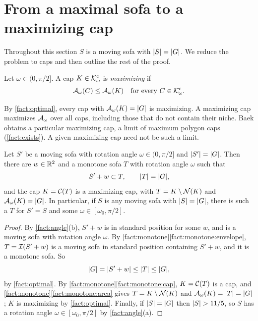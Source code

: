 \section{From a maximal sofa to a maximizing cap}\label{sec:reduction}

Throughout this section $S$ is a moving sofa with $\lvert S\rvert=\lvert G\rvert$. We reduce
the problem to caps and then outline the rest of the proof.

\begin{definition}\label{def:maximizing}
Let $\omega\in(0,\pi/2]$. A cap $K\in\mathcal{K}^{\mathrm{c}}_\omega$ is \emph{maximizing} if
\[
  \mathcal{A}_\omega(C)\le\mathcal{A}_\omega(K)\quad\text{for every }C\in\mathcal{K}^{\mathrm{c}}_\omega.
\]
\end{definition}

By \cref{fact:optimal}, every cap with $\mathcal{A}_\omega(K)=\lvert G\rvert$ is maximizing. A
maximizing cap maximizes $\mathcal{A}_\omega$ over all caps, including those that do not
contain their niche. Baek obtains a particular maximizing cap, a limit of
maximum polygon caps (\cref{fact:exists}). A given maximizing cap need not be
such a limit.

\begin{proposition}\label{prop:reduction}
Let $S'$ be a moving sofa with rotation angle $\omega\in(0,\pi/2]$ and
$\lvert S'\rvert=\lvert G\rvert$. Then there are $w\in\mathbb{R}^2$ and a monotone sofa $T$ with
rotation angle $\omega$ such that
\[
  S'+w\subset T,\qquad \lvert T\rvert=\lvert G\rvert,
\]
and the cap $K=\mathcal{C}(T)$ is a maximizing cap, with $T=K\setminus\mathcal{N}(K)$ and
$\mathcal{A}_\omega(K)=\lvert G\rvert$. In particular, if $S$ is any moving sofa with $\lvert S\rvert=\lvert G\rvert$, there is such a $T$ for $S'=S$ and some $\omega\in[\omega_0,\pi/2]$.
\end{proposition}

\begin{proof}
By \cref{fact:angle}(b), $S'+w$ is in standard position for some $w$, and is a
moving sofa with rotation angle $\omega$. By
\cref{fact:monotone}\ref{fact:monotone:envelope}, $T=\mathcal{I}(S'+w)$ is a moving sofa
in standard position containing $S'+w$, and it is a monotone sofa. So
\[
  \lvert G\rvert=\lvert S'+w\rvert\le\lvert T\rvert\le\lvert G\rvert,
\]
by \cref{fact:optimal}. By \cref{fact:monotone}\ref{fact:monotone:cap},
$K=\mathcal{C}(T)$ is a cap, and \cref{fact:monotone}\ref{fact:monotone:area} gives
$T=K\setminus\mathcal{N}(K)$ and $\mathcal{A}_\omega(K)=\lvert T\rvert=\lvert G\rvert$; $K$ is maximizing by
\cref{fact:optimal}. Finally, if $\lvert S\rvert=\lvert G\rvert$ then $\lvert S\rvert>11/5$, so $S$ has
a rotation angle $\omega\in[\omega_0,\pi/2]$ by \cref{fact:angle}(a).
\end{proof}

